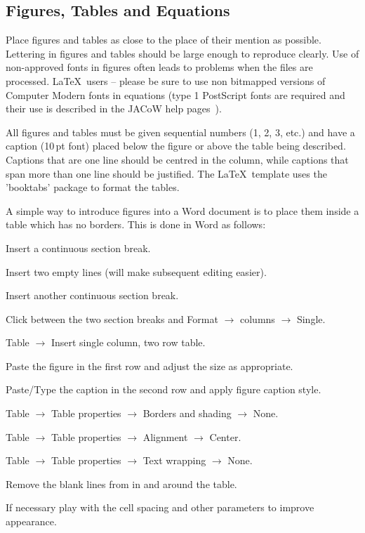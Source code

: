 \documentclass{JAC2003}
\begin{document}
\subsection{Figures, Tables and Equations}

Place figures and tables as close to the place of their mention as
possible. Lettering in figures and tables should be large enough to
reproduce clearly. Use of non-approved fonts in figures often leads to
problems when the files are processed. \LaTeX\ users -- please be sure to use non bitmapped
versions of Computer Modern fonts in equations (type 1 PostScript fonts are
required and their use is described in the JACoW help pages~\cite{jacow-help}).

All figures and tables must be given sequential numbers (1, 2, 3, etc.) and
have a caption (10\,pt font) placed below the figure or above the table being described.
Captions that are one line should be centred in the column, while captions
that span more than one line should be justified. The \LaTeX\ template uses the 'booktabs' 
package to format the tables.

A simple way to introduce figures into a Word document is to place them inside a table which has no borders. This is done in Word as follows:
\begin{Itemize}
\item	Insert a continuous section break.
\item	Insert two empty lines (will make subsequent editing easier).
\item	Insert another continuous section break.
\item	Click between the two section breaks and Format $\rightarrow$ columns $\rightarrow$ Single.
\item	Table $\rightarrow$ Insert single column, two row table.
\item	Paste the figure in the first row and adjust the size as appropriate.
\item	Paste/Type the caption in the second row and apply figure caption style.
\item	Table $\rightarrow$ Table properties $\rightarrow$ Borders and shading $\rightarrow$ None.
\item	Table $\rightarrow$ Table properties $\rightarrow$ Alignment $\rightarrow$ Center.
\item	Table $\rightarrow$ Table properties $\rightarrow$ Text wrapping $\rightarrow$ None.
\item	Remove the blank lines from in and around the table.
\item	If necessary play with the cell spacing and other parameters to improve appearance.
\end{Itemize}
\end{document}
